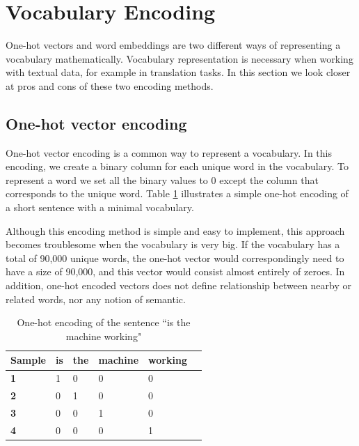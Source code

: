 
\section{Vocabulary Encoding}
\label{sec:vocabulary_encoding}
One-hot vectors and word embeddings are two different ways of representing a vocabulary mathematically. Vocabulary representation is necessary when working with textual data, for example in translation tasks. In this section we look closer at pros and cons of these two encoding methods.

\subsection{One-hot vector encoding}
One-hot vector encoding is a common way to represent a vocabulary. In this encoding, we create a binary column for each unique word in the vocabulary. To represent a word we set all the binary values to \(0\) except the column that corresponds to the unique word. Table  \ref{table:one_hot_encoding} illustrates a simple one-hot encoding of a short sentence with a minimal vocabulary. 

Although this encoding method is simple and easy to implement, this approach becomes troublesome when the vocabulary is very big. If the vocabulary has a total of 90,000 unique words, the one-hot vector would correspondingly need to have a size of 90,000, and this vector would consist almost entirely of zeroes. In addition, one-hot encoded vectors does not define relationship between nearby or related words, nor any notion of semantic.

\begin{table}[H]
    \centering
    \begin{tabular}{|l|l|l|l|l|l|}
        \hline
        \textbf{Sample} & \textbf{is} & \textbf{the} & \textbf{machine} & \textbf{working} \\ \hline
        \textbf{1}      & 1           & 0            & 0                & 0                \\ \hline
        \textbf{2}      & 0           & 1            & 0                & 0                \\ \hline
        \textbf{3}      & 0           & 0            & 1                & 0                \\ \hline
        \textbf{4}      & 0           & 0            & 0                & 1                \\ \hline
    \end{tabular}
    \caption{One-hot encoding of the sentence ``is the machine working"}
    \label{table:one_hot_encoding}
\end{table}

